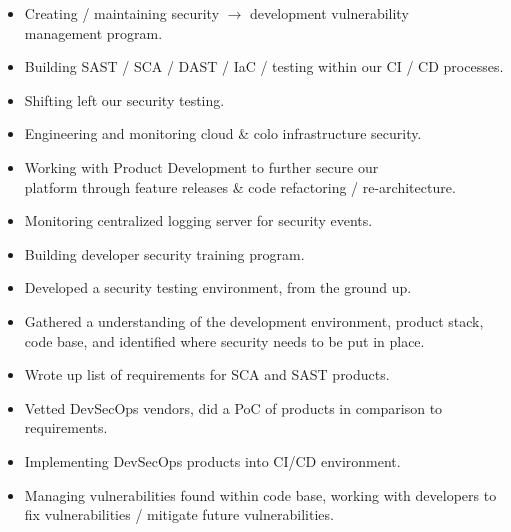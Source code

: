 \documentclass[10pt,a4paper,ragged2e]{rohrbach}
\begin{document}
\begin{paracol}{2}

\begin{itemize}
  \item Creating / maintaining security $\rightarrow$ development vulnerability\\ management program.
  \item Building SAST / SCA / DAST / IaC / testing within our CI / CD processes.
  \item Shifting left our security testing.
  \item Engineering and monitoring cloud \& colo infrastructure security.
  \item Working with Product Development to further secure our\\ platform through feature releases \& code refactoring / re-architecture.
  \item Monitoring centralized logging server for security events.
  \item Building developer security training program.
\end{itemize}

\divider

\begin{itemize}
  \item Developed a security testing environment, from the ground up.
  \item Gathered a understanding of the development environment, product stack, code base, and identified where security needs to be put in place.
  \item Wrote up list of requirements for SCA and SAST products.
  \item Vetted DevSecOps vendors, did a PoC of products in comparison to requirements.
  \item Implementing DevSecOps products into CI/CD environment.
  \item Managing vulnerabilities found within code base, working with developers to fix vulnerabilities / mitigate future vulnerabilities.
\end{itemize}


\end{paracol}
\end{document}

